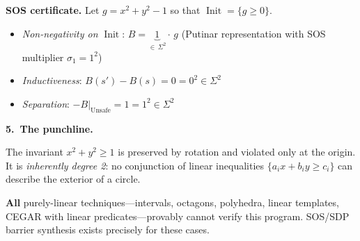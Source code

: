 \documentclass[10pt,a4paper]{article}
\newcommand{\Init}{\operatorname{Init}}
\newcommand{\Unsafe}{\operatorname{Unsafe}}
\begin{document}
\vspace{5pt}
\textbf{SOS certificate.}\;
Let $g = x^2+y^2-1$ so that $\Init = \{g \geq 0\}$.
\begin{itemize}[nosep,leftmargin=1.5em]
\item \emph{Non-negativity on} $\Init$:\;
  $B = \underbrace{1}_{\in\,\Sigma^2} \cdot\, g$
  \quad(Putinar representation with SOS multiplier $\sigma_1 = 1^2$)
\item \emph{Inductiveness}:\;
  $B(s') - B(s) = 0 = 0^2 \in \Sigma^2$
\item \emph{Separation}:\;
  $-B\big|_{\Unsafe} = 1 = 1^2 \in \Sigma^2$
\end{itemize}

\vspace{3pt}
\textbf{5.\ The punchline.}

The invariant $x^2 + y^2 \geq 1$ is preserved by rotation and violated only at the origin.
It is \emph{inherently degree 2}: no conjunction of linear inequalities $\{a_ix + b_iy \geq c_i\}$
can describe the exterior of a circle.

\textbf{All} purely-linear techniques---intervals, octagons, polyhedra, linear templates,
CEGAR with linear predicates---provably cannot verify this program.
SOS/SDP barrier synthesis exists precisely for these cases.
\end{document}
